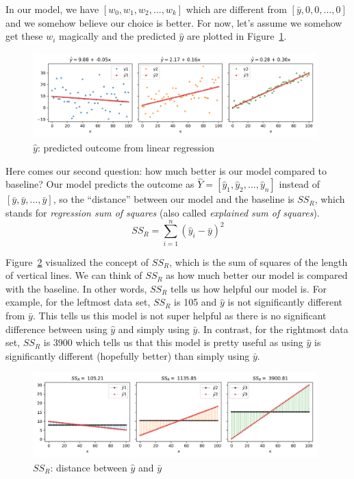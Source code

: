 \documentclass[
	letterpaper
]{article}
\begin{document}
In our model, we have $[w_0, w_1, w_2, ..., w_k]$ which are different from $[\bar y, 0, 0, ..., 0]$ and we somehow believe our choice is better.
For now, let's assume we somehow get these $w_i$ magically and the predicted $\hat y$ are plotted in Figure~\ref{fig:yhat}.
\begin{figure}[htbp]
	\centering
	\includegraphics[width=0.98\textwidth]{figures/comparison-yhat.png}
	\caption{$\hat y$: predicted outcome from linear regression}
	\label{fig:yhat}
\end{figure}

Here comes our second question: how much better is our model compared to baseline?
Our model predicts the outcome as $\hat Y = [\hat y_1, \hat y_2, ..., \hat y_n]$ instead of $[\bar y, \bar y, ..., \bar y]$, so the ``distance'' between our model and the baseline is $SS_R$, which stands for \textit{regression sum of squares} (also called \textit{explained sum of squares}).
\begin{equation}
SS_R= \sum_{i = 1}^n (\hat y_i - \bar y) ^2 
\end{equation}

Figure~\ref{fig:ssr} visualized the concept of $SS_R$, which is the sum of squares of the length of vertical lines.
We can think of $SS_R$ as how much better our model is compared with the baseline.
In other words, $SS_R$ tells us how helpful our model is.
For example, for the leftmost data set, $SS_R$ is 105 and $\hat y$ is not significantly different from $\bar y$.
This tells us this model is not super helpful as there is no significant difference between using $\hat y$ and simply using $\bar y$.
In contrast, for the rightmost data set, $SS_R$ is 3900 which tells us that this model is pretty useful as using $\hat y$ is significantly different (hopefully better) than simply using $\bar y$.
\begin{figure}[htbp]
	\centering
	\includegraphics[width=0.98\textwidth]{figures/comparison-ssr.png}
	\caption{$SS_R$: distance between $\hat y$ and $\bar y$}
	\label{fig:ssr}
\end{figure}
\end{document}
